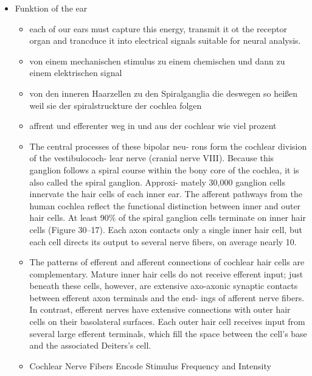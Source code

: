 \documentclass[12pt,a4paper,pdftex]{article}
\begin{document}
\begin{itemize}
    \item Funktion of the ear
    \begin{itemize}
        \item each of our ears must capture this energy, transmit it ot the receptor organ and trancduce it into electrical signals suitable for neural analysis. \cite{kandel2013principles}
        \item von einem mechanischen stimulus zu einem chemischen und dann zu einem elektrischen signal
        \item von den inneren Haarzellen zu den Spiralganglia die deswegen so heißen weil sie der spiralstruckture der cochlea folgen \cite{kandel2013principles}
        \item affrent und efferenter weg in und aus der cochlear wie viel prozent 
        \item The central processes of these bipolar neu-
        rons form the cochlear division of the vestibulococh-
        lear nerve (cranial nerve VIII). Because this ganglion
        follows a spiral course within the bony core of the
        cochlea, it is also called the spiral ganglion. Approxi-
        mately 30,000 ganglion cells innervate the hair cells of
        each inner ear.
        The afferent pathways from the human cochlea
        reflect the functional distinction between inner and
        outer hair cells. At least 90\% of the spiral ganglion
        cells terminate on inner hair cells (Figure 30–17). Each
        axon contacts only a single inner hair cell, but each cell
        directs its output to several nerve fibers, on average
        nearly 10.
        \item The patterns of efferent and afferent connections
        of cochlear hair cells are complementary. Mature inner
        hair cells do not receive efferent input; just beneath
        these cells, however, are extensive axo-axonic synaptic
        contacts between efferent axon terminals and the end-
        ings of afferent nerve fibers. In contrast, efferent nerves
        have extensive connections with outer hair cells on their
        basolateral surfaces. Each outer hair cell receives input
        from several large efferent terminals, which fill the space
        between the cell’s base and the associated Deiters’s cell.
        \item Cochlear Nerve Fibers Encode Stimulus Frequency
        and Intensity
        \end{itemize}
        

\end{itemize}
\end{document}
